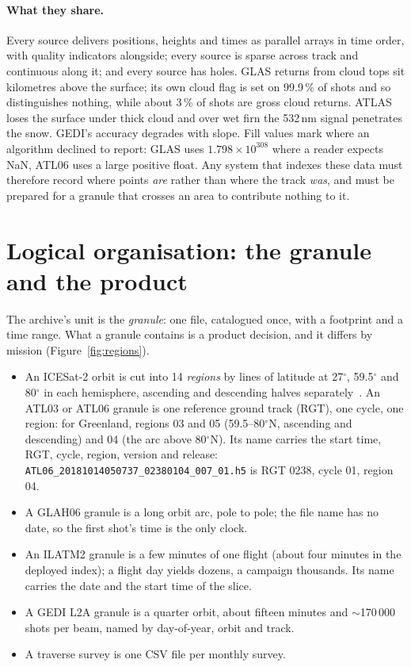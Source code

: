 \documentclass[10pt,a4paper]{article}
\newcommand{\code}[1]{\texttt{#1}}
\begin{document}
\paragraph{What they share.} Every source delivers positions, heights and times as parallel arrays in time order,
with quality indicators alongside; every source is sparse across track and continuous along it; and every source
has holes. GLAS returns from cloud tops sit kilometres above the surface; its own cloud flag is set on 99.9\,\% of
shots and so distinguishes nothing, while about 3\,\% of shots are gross cloud returns. ATLAS loses the surface
under thick cloud and over wet firn the 532\,nm signal penetrates the snow. GEDI's accuracy degrades with slope.
Fill values mark where an algorithm declined to report: GLAS uses $1.798\times10^{308}$ where a reader expects NaN,
ATL06 uses a large positive float. Any system that indexes these data must therefore record where points \emph{are}
rather than where the track \emph{was}, and must be prepared for a granule that crosses an area to contribute
nothing to it.

\section{Logical organisation: the granule and the product}
\label{ch:logical}

The archive's unit is the \emph{granule}: one file, catalogued once, with a footprint and a time range. What a
granule contains is a product decision, and it differs by mission (Figure~\ref{fig:regions}).

\begin{itemize}
\item An ICESat-2 orbit is cut into 14 \emph{regions} by lines of latitude at 27$^\circ$, 59.5$^\circ$ and
  80$^\circ$ in each hemisphere, ascending and descending halves separately~\citep{atl06v7}. An ATL03 or ATL06
  granule is one reference ground track (RGT), one cycle, one region: for Greenland, regions 03 and 05
  (59.5--80$^\circ$N, ascending and descending) and 04 (the arc above 80$^\circ$N). Its name carries the start
  time, RGT, cycle, region, version and release:
  \code{ATL06\_20181014050737\_02380104\_007\_01.h5} is RGT 0238, cycle 01, region 04.
\item A GLAH06 granule is a long orbit arc, pole to pole; the file name has no date, so the first shot's time is
  the only clock.
\item An ILATM2 granule is a few minutes of one flight (about four minutes in the deployed index); a flight
  day yields dozens, a campaign thousands. Its name carries the date and the start time of the slice.
\item A GEDI L2A granule is a quarter orbit, about fifteen minutes and $\sim$170\,000 shots per beam, named by
  day-of-year, orbit and track.
\item A traverse survey is one CSV file per monthly survey.
\end{itemize}
\end{document}
